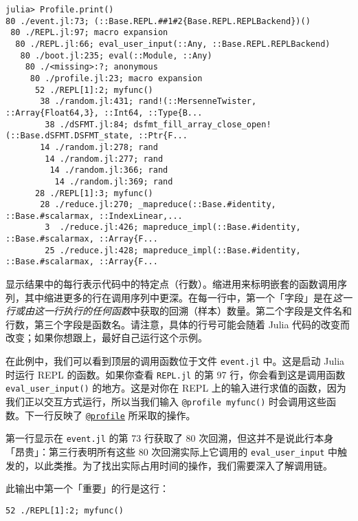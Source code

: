 \begin{verbatim}
julia> Profile.print()
80 ./event.jl:73; (::Base.REPL.##1#2{Base.REPL.REPLBackend})()
 80 ./REPL.jl:97; macro expansion
  80 ./REPL.jl:66; eval_user_input(::Any, ::Base.REPL.REPLBackend)
   80 ./boot.jl:235; eval(::Module, ::Any)
    80 ./<missing>:?; anonymous
     80 ./profile.jl:23; macro expansion
      52 ./REPL[1]:2; myfunc()
       38 ./random.jl:431; rand!(::MersenneTwister, ::Array{Float64,3}, ::Int64, ::Type{B...
        38 ./dSFMT.jl:84; dsfmt_fill_array_close_open!(::Base.dSFMT.DSFMT_state, ::Ptr{F...
       14 ./random.jl:278; rand
        14 ./random.jl:277; rand
         14 ./random.jl:366; rand
          14 ./random.jl:369; rand
      28 ./REPL[1]:3; myfunc()
       28 ./reduce.jl:270; _mapreduce(::Base.#identity, ::Base.#scalarmax, ::IndexLinear,...
        3  ./reduce.jl:426; mapreduce_impl(::Base.#identity, ::Base.#scalarmax, ::Array{F...
        25 ./reduce.jl:428; mapreduce_impl(::Base.#identity, ::Base.#scalarmax, ::Array{F...
\end{verbatim}



显示结果中的每行表示代码中的特定点（行数）。缩进用来标明嵌套的函数调用序列，其中缩进更多的行在调用序列中更深。在每一行中，第一个「字段」是在\emph{这一行或由这一行执行的任何函数}中获取的回溯（样本）数量。第二个字段是文件名和行数，第三个字段是函数名。请注意，具体的行号可能会随着 Julia 代码的改变而改变；如果你想跟上，最好自己运行这个示例。



在此例中，我们可以看到顶层的调用函数位于文件 \texttt{event.jl} 中。这是启动 Julia 时运行 REPL 的函数。如果你查看 \texttt{REPL.jl} 的第 97 行，你会看到这是调用函数 \texttt{eval\_user\_input()} 的地方。这是对你在 REPL 上的输入进行求值的函数，因为我们正以交互方式运行，所以当我们输入 \texttt{@profile myfunc()} 时会调用这些函数。下一行反映了 \hyperlink{9691715859147716436}{\texttt{@profile}} 所采取的操作。



第一行显示在 \texttt{event.jl} 的第 73 行获取了 80 次回溯，但这并不是说此行本身「昂贵」：第三行表明所有这些 80 次回溯实际上它调用的 \texttt{eval\_user\_input} 中触发的，以此类推。为了找出实际占用时间的操作，我们需要深入了解调用链。



此输出中第一个「重要」的行是这行：




\begin{lstlisting}
52 ./REPL[1]:2; myfunc()
\end{lstlisting}



